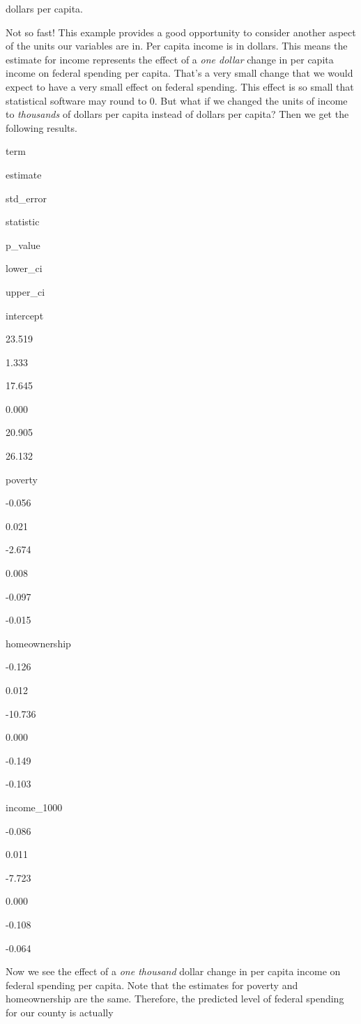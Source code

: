\documentclass[
]{book}
\begin{document}
dollars per capita.

Not so fast! This example provides a good opportunity to consider another aspect of the units our variables are in. Per capita income is in dollars. This means the estimate for income represents the effect of a \emph{one dollar} change in per capita income on federal spending per capita. That's a very small change that we would expect to have a very small effect on federal spending. This effect is so small that statistical software may round to 0. But what if we changed the units of income to \emph{thousands} of dollars per capita instead of dollars per capita? Then we get the following results.

term

estimate

std\_error

statistic

p\_value

lower\_ci

upper\_ci

intercept

23.519

1.333

17.645

0.000

20.905

26.132

poverty

-0.056

0.021

-2.674

0.008

-0.097

-0.015

homeownership

-0.126

0.012

-10.736

0.000

-0.149

-0.103

income\_1000

-0.086

0.011

-7.723

0.000

-0.108

-0.064

Now we see the effect of a \emph{one thousand} dollar change in per capita income on federal spending per capita. Note that the estimates for poverty and homeownership are the same. Therefore, the predicted level of federal spending for our county is actually
\end{document}
